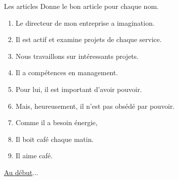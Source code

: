 \begin{frame}{Les articles}
  Donne le bon article pour chaque nom.
  \begin{enumerate}
    \item Le directeur de mon entreprise a \underline{} imagination.
    \item Il est actif et examine \underline{} projets de chaque service.
    \item Nous travaillons sur \underline{} intéressants projets.
    \item Il a \underline{} compétences en management.
    \item Pour lui, il est important d'avoir \underline{} pouvoir.
    \item Mais, heureusement, il n'est pas obsédé par \underline{} pouvoir.
    \item Comme il a besoin \underline{} énergie,
    \item Il boit \underline{} café chaque matin.
    \item Il aime \underline{} café.
  \end{enumerate}
  \vspace{0.25cm}
  \raggedleft\hyperlink{début}{Au début}...
\end{frame}
